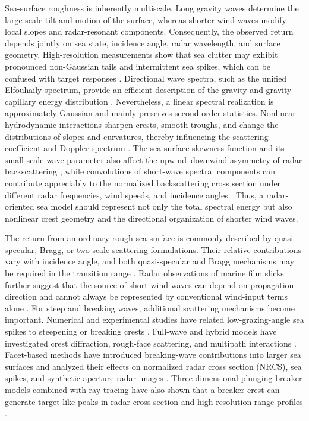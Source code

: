 Sea-surface roughness is inherently multiscale. Long gravity waves determine the large-scale tilt and motion of the surface, whereas shorter wind waves modify local slopes and radar-resonant components. Consequently, the observed return depends jointly on sea state, incidence angle, radar wavelength, and surface geometry. High-resolution measurements show that sea clutter may exhibit pronounced non-Gaussian tails and intermittent sea spikes, which can be confused with target responses \cite{carretero2010statistical,fiche2015xband,bocquet2022lga,melief2006seaspikes,rosenberg2013seaspike}. Directional wave spectra, such as the unified Elfouhaily spectrum, provide an efficient description of the gravity and gravity--capillary energy distribution \cite{elfouhaily1997unified}. Nevertheless, a linear spectral realization is approximately Gaussian and mainly preserves second-order statistics. Nonlinear hydrodynamic interactions sharpen crests, smooth troughs, and change the distributions of slopes and curvatures, thereby influencing the scattering coefficient and Doppler spectrum \cite{zhang2023secondorder}. The sea-surface skewness function and its small-scale-wave parameter also affect the upwind--downwind asymmetry of radar backscattering \cite{xie2024skewness}, while convolutions of short-wave spectral components can contribute appreciably to the normalized backscattering cross section under different radar frequencies, wind speeds, and incidence angles \cite{xie2022convolutions}. Thus, a radar-oriented sea model should represent not only the total spectral energy but also nonlinear crest geometry and the directional organization of shorter wind waves.

The return from an ordinary rough sea surface is commonly described by quasi-specular, Bragg, or two-scale scattering formulations. Their relative contributions vary with incidence angle, and both quasi-specular and Bragg mechanisms may be required in the transition range \cite{ye2022improvedTSM}. Radar observations of marine film slicks further suggest that the source of short wind waves can depend on propagation direction and cannot always be represented by conventional wind-input terms alone \cite{sergievskaya2024shortwaves}. For steep and breaking waves, additional scattering mechanisms become important. Numerical and experimental studies have related low-grazing-angle sea spikes to steepening or breaking crests \cite{holliday1998steepening,sletten2003breaking,west2002plunging}. Full-wave and hybrid models have investigated crest diffraction, rough-face scattering, and multipath interactions \cite{west1998mmgtd,west1999ray,west2002multipath,zhao2005spilling,yang2011breaking}. Facet-based methods have introduced breaking-wave contributions into larger sea surfaces and analyzed their effects on normalized radar cross section (NRCS), sea spikes, and synthetic aperture radar images \cite{li2017facet}. Three-dimensional plunging-breaker models combined with ray tracing have also shown that a breaker crest can generate target-like peaks in radar cross section and high-resolution range profiles \cite{dong2023plunging}.

